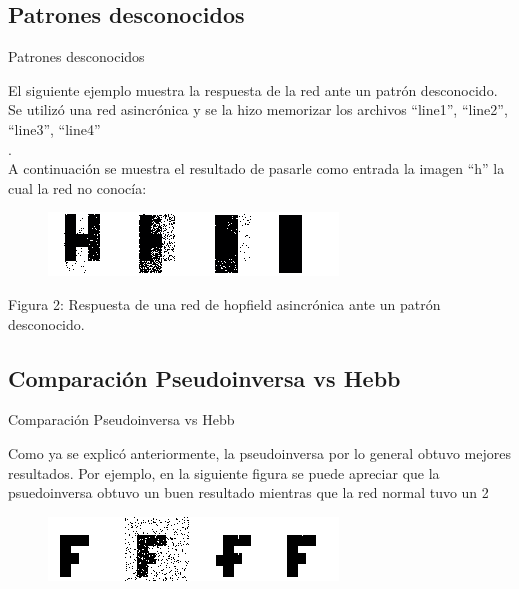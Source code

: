 \documentclass{beamer}
\begin{document}
\subsection{Patrones desconocidos}
\begin{frame}{Patrones desconocidos}

\par El siguiente ejemplo muestra la respuesta de la red ante un patrón desconocido. Se utilizó una red asincrónica y se la hizo memorizar los archivos ``line1'', ``line2'', ``line3'', ``line4''\\.\\
A continuación se muestra el resultado de pasarle como entrada la imagen ``h''  la cual la red no conocía: \\

\begin{figure}[H]
\begin{center}
\includegraphics[scale=0.60]{./images/hnoinvnopar.png}
\label{modelado}
\end{center}
\end{figure}

\begin{center}
\par Figura 2: Respuesta de una red de hopfield asincrónica ante un patrón desconocido.
\end{center}
\end{frame}

\subsection{Comparación Pseudoinversa vs Hebb}
\begin{frame}{Comparación Pseudoinversa vs Hebb}

Como ya se explicó anteriormente, la pseudoinversa por lo general obtuvo mejores resultados. Por ejemplo, en la siguiente figura 
se puede apreciar que la psuedoinversa obtuvo un buen resultado mientras que la red normal tuvo un 2%

\begin{figure}[H]
\begin{center}
\includegraphics[scale=0.8]{./images/copara.png}
\label{modelado}
\end{center}
\end{figure}
\end{frame}
\end{document}
